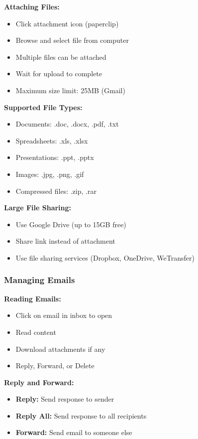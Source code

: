 \documentclass[12pt,a4paper]{article}
\begin{document}
\textbf{Attaching Files:}
\begin{itemize}
    \item Click attachment icon (paperclip)
    \item Browse and select file from computer
    \item Multiple files can be attached
    \item Wait for upload to complete
    \item Maximum size limit: 25MB (Gmail)
\end{itemize}

\textbf{Supported File Types:}
\begin{itemize}
    \item Documents: .doc, .docx, .pdf, .txt
    \item Spreadsheets: .xls, .xlsx
    \item Presentations: .ppt, .pptx
    \item Images: .jpg, .png, .gif
    \item Compressed files: .zip, .rar
\end{itemize}

\textbf{Large File Sharing:}
\begin{itemize}
    \item Use Google Drive (up to 15GB free)
    \item Share link instead of attachment
    \item Use file sharing services (Dropbox, OneDrive, WeTransfer)
\end{itemize}

\subsubsection{Managing Emails}

\textbf{Reading Emails:}
\begin{itemize}
    \item Click on email in inbox to open
    \item Read content
    \item Download attachments if any
    \item Reply, Forward, or Delete
\end{itemize}

\textbf{Reply and Forward:}
\begin{itemize}
    \item \textbf{Reply:} Send response to sender
    \item \textbf{Reply All:} Send response to all recipients
    \item \textbf{Forward:} Send email to someone else
\end{itemize}
\end{document}
